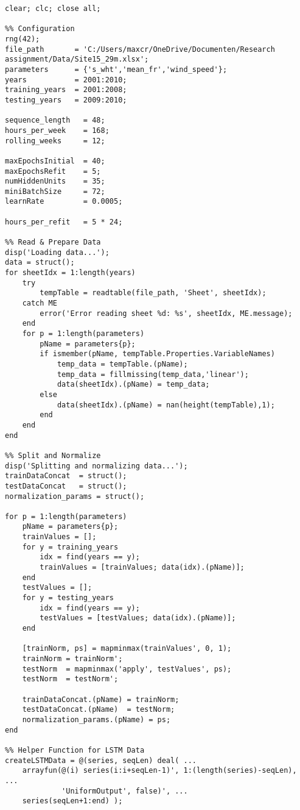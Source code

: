 \label{append:lstm_full_script}
\begin{verbatim}
clear; clc; close all;

%% Configuration
rng(42);
file_path       = 'C:/Users/maxcr/OneDrive/Documenten/Research assignment/Data/Site15_29m.xlsx';
parameters      = {'s_wht','mean_fr','wind_speed'};
years           = 2001:2010;
training_years  = 2001:2008;
testing_years   = 2009:2010;

sequence_length   = 48;     
hours_per_week    = 168;    
rolling_weeks     = 12;     

maxEpochsInitial  = 40;     
maxEpochsRefit    = 5;      
numHiddenUnits    = 35;     
miniBatchSize     = 72;     
learnRate         = 0.0005; 

hours_per_refit   = 5 * 24; 

%% Read & Prepare Data
disp('Loading data...');
data = struct();
for sheetIdx = 1:length(years)
    try
        tempTable = readtable(file_path, 'Sheet', sheetIdx);
    catch ME
        error('Error reading sheet %d: %s', sheetIdx, ME.message);
    end
    for p = 1:length(parameters)
        pName = parameters{p};
        if ismember(pName, tempTable.Properties.VariableNames)
            temp_data = tempTable.(pName);
            temp_data = fillmissing(temp_data,'linear');
            data(sheetIdx).(pName) = temp_data;
        else
            data(sheetIdx).(pName) = nan(height(tempTable),1);
        end
    end
end

%% Split and Normalize
disp('Splitting and normalizing data...');
trainDataConcat  = struct();
testDataConcat   = struct();
normalization_params = struct();

for p = 1:length(parameters)
    pName = parameters{p};
    trainValues = [];
    for y = training_years
        idx = find(years == y);
        trainValues = [trainValues; data(idx).(pName)];
    end
    testValues = [];
    for y = testing_years
        idx = find(years == y);
        testValues = [testValues; data(idx).(pName)];
    end
    
    [trainNorm, ps] = mapminmax(trainValues', 0, 1);
    trainNorm = trainNorm';
    testNorm  = mapminmax('apply', testValues', ps);
    testNorm  = testNorm';
    
    trainDataConcat.(pName) = trainNorm;
    testDataConcat.(pName)  = testNorm;
    normalization_params.(pName) = ps;
end

%% Helper Function for LSTM Data
createLSTMData = @(series, seqLen) deal( ...
    arrayfun(@(i) series(i:i+seqLen-1)', 1:(length(series)-seqLen), ...
             'UniformOutput', false)', ...
    series(seqLen+1:end) );


\end{verbatim}
